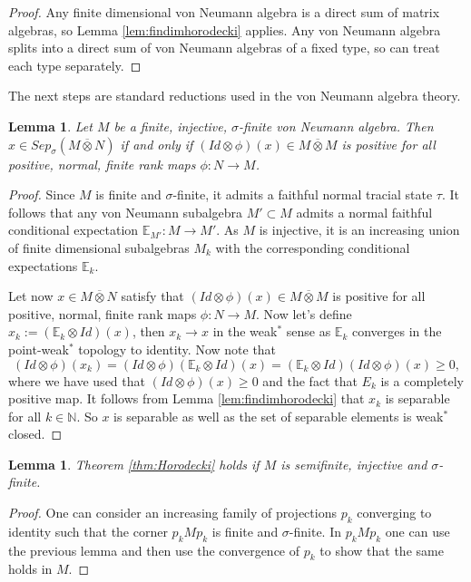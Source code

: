 \documentclass[11pt]{article}
\numberwithin{theorem}{section}
\newtheorem{lemma}[theorem]{Lemma}
\begin{document}
\begin{proof}
Any finite dimensional von Neumann algebra is a direct sum of matrix algebras, so Lemma \ref{lem:findimhorodecki} applies. Any von Neumann algebra splits into a direct sum of von Neumann algebras of a fixed type, so can treat each type separately. 
\end{proof}
The next steps are standard reductions used in the von Neumann algebra theory.
\begin{lemma}
Let $M$ be a finite, injective, $\sigma$-finite von Neumann algebra. Then $x\in Sep_{\sigma}(M\overline{\otimes} N)$ if and only if $(Id\otimes \phi)(x) \in M\overline{\otimes} M$ is positive for all positive, normal, finite rank maps $\phi: N \to M$.
\end{lemma}
\begin{proof}
Since $M$ is finite and $\sigma$-finite, it admits a faithful normal tracial state $\tau$. It follows that any von Neumann subalgebra $M' \subset M$ admits a normal faithful conditional expectation $\mathbb{E}_{M'}: M \to M'$. As $M$ is injective, it is an increasing union of finite dimensional subalgebras $M_{k}$ with the corresponding conditional expectations $\mathbb{E}_{k}$.

Let now $x \in M \overline{\otimes} N$ satisfy that $(Id\otimes \phi)(x) \in M\overline{\otimes} M$ is positive for all positive, normal, finite rank maps $\phi: N \to M$. Now let's define $x_k:=(\mathbb{E}_{k}\otimes Id)(x)$, then $x_k\rightarrow x$ in the weak$^*$ sense as $\mathbb{E}_{k}$ converges in the point-weak$^{\ast}$ topology to identity. Now note that 
\[(Id\otimes \phi)(x_k)=(Id\otimes \phi)(\mathbb{E}_{k}\otimes Id)(x)=(\mathbb{E}_{k}\otimes Id)(Id\otimes \phi)(x)\geq0,\]
where we have used that $(Id\otimes \phi)(x)\geq 0$ and the fact that $E_k$ is a completely positive map. 
 It follows from Lemma \ref{lem:findimhorodecki} that $x_k$ is separable for all $k \in \mathbb{N}$. So $x$ is separable as well as the set of separable elements is weak$^*$ closed. 
\end{proof}
\begin{lemma}\label{lem:semifinite}
Theorem \ref{thm:Horodecki} holds if $M$ is semifinite, injective and $\sigma$-finite.
\end{lemma}
\begin{proof}
One can consider an increasing family of projections $p_{k}$ converging to identity such that the corner $p_{k} M p_{k}$ is finite and $\sigma$-finite. In $p_{k}M p_{k}$ one can use the previous lemma and then use the convergence of $p_{k}$ to show that the same holds in $M$.    
\end{proof}
\end{document}
